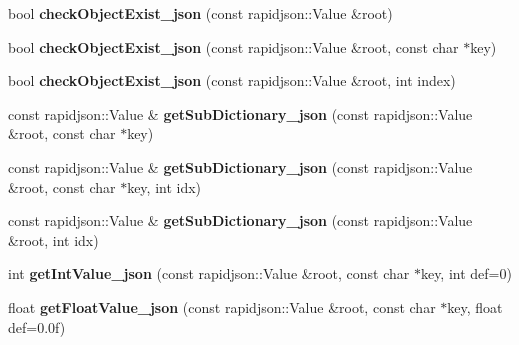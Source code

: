 \begin{DoxyCompactItemize}
\item 
\mbox{\label{classcocostudio_1_1DictionaryHelper_a3d1a9a302d8bf1c41053ea616f41539a}} 
bool {\bfseries check\+Object\+Exist\+\_\+json} (const rapidjson\+::\+Value \&root)
\item 
\mbox{\label{classcocostudio_1_1DictionaryHelper_a5991f88c3c4d93d711bd568bbcd20013}} 
bool {\bfseries check\+Object\+Exist\+\_\+json} (const rapidjson\+::\+Value \&root, const char $\ast$key)
\item 
\mbox{\label{classcocostudio_1_1DictionaryHelper_af8bc05deb348d3227899095e8296a9ff}} 
bool {\bfseries check\+Object\+Exist\+\_\+json} (const rapidjson\+::\+Value \&root, int index)
\item 
\mbox{\label{classcocostudio_1_1DictionaryHelper_a46a69807619fe7d878c4aa9747dab623}} 
const rapidjson\+::\+Value \& {\bfseries get\+Sub\+Dictionary\+\_\+json} (const rapidjson\+::\+Value \&root, const char $\ast$key)
\item 
\mbox{\label{classcocostudio_1_1DictionaryHelper_acfdd3ac0596f5c9332dac148e35c3572}} 
const rapidjson\+::\+Value \& {\bfseries get\+Sub\+Dictionary\+\_\+json} (const rapidjson\+::\+Value \&root, const char $\ast$key, int idx)
\item 
\mbox{\label{classcocostudio_1_1DictionaryHelper_aef515d33664c45164662200b413612a7}} 
const rapidjson\+::\+Value \& {\bfseries get\+Sub\+Dictionary\+\_\+json} (const rapidjson\+::\+Value \&root, int idx)
\item 
\mbox{\label{classcocostudio_1_1DictionaryHelper_ae84b0e5fb2b56e9f512891f48073a263}} 
int {\bfseries get\+Int\+Value\+\_\+json} (const rapidjson\+::\+Value \&root, const char $\ast$key, int def=0)
\item 
\mbox{\label{classcocostudio_1_1DictionaryHelper_a4ebbb4cdc7953d4e243d846fac298247}} 
float {\bfseries get\+Float\+Value\+\_\+json} (const rapidjson\+::\+Value \&root, const char $\ast$key, float def=0.\+0f)

\end{DoxyCompactItemize}
